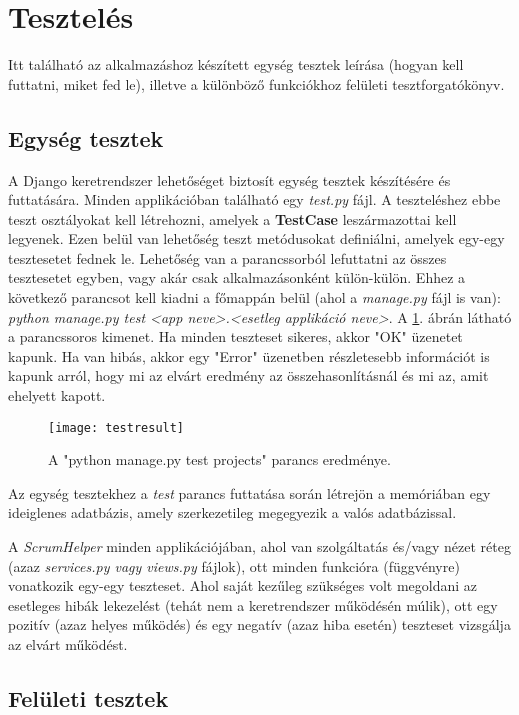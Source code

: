 \section{Tesztelés}

Itt található az alkalmazáshoz készített egység tesztek leírása (hogyan kell futtatni, miket fed le), illetve a különböző funkciókhoz felületi tesztforgatókönyv.

\subsection{Egység tesztek}

A Django keretrendszer lehetőséget biztosít egység tesztek készítésére és futtatására. Minden applikációban található egy \textit{test.py} fájl. A teszteléshez ebbe teszt osztályokat kell létrehozni, amelyek a \textbf{TestCase} leszármazottai kell legyenek. Ezen belül van lehetőség teszt metódusokat definiálni, amelyek egy-egy tesztesetet fednek le. Lehetőség van a parancssorból lefuttatni az összes tesztesetet egyben, vagy akár csak alkalmazásonként külön-külön. Ehhez a következő parancsot kell kiadni a főmappán belül (ahol a \textit{manage.py} fájl is van): \textit{python manage.py test <app neve>.<esetleg applikáció neve>}. A \ref{fig:tests}. ábrán látható a parancssoros kimenet. Ha minden teszteset sikeres, akkor "OK" üzenetet kapunk. Ha van hibás, akkor egy "Error" üzenetben részletesebb információt is kapunk arról, hogy mi az elvárt eredmény az összehasonlításnál és mi az, amit ehelyett kapott.

\begin{figure}[H]
	\centering
	\texttt{[image: testresult]}
	\caption{A "python manage.py test projects" parancs eredménye.}
	\label{fig:tests}
\end{figure}

Az egység tesztekhez a \textit{test} parancs futtatása során létrejön a memóriában egy ideiglenes adatbázis, amely szerkezetileg megegyezik a valós adatbázissal. 

A \textit{ScrumHelper} minden applikációjában, ahol van szolgáltatás és/vagy nézet réteg (azaz \textit{services.py vagy views.py} fájlok), ott minden funkcióra (függvényre) vonatkozik egy-egy teszteset. Ahol saját kezűleg szükséges volt megoldani az esetleges hibák lekezelést (tehát nem a keretrendszer működésén múlik), ott egy pozitív (azaz helyes működés) és egy negatív (azaz hiba esetén) teszteset vizsgálja az elvárt működést.

\subsection{Felületi tesztek}

